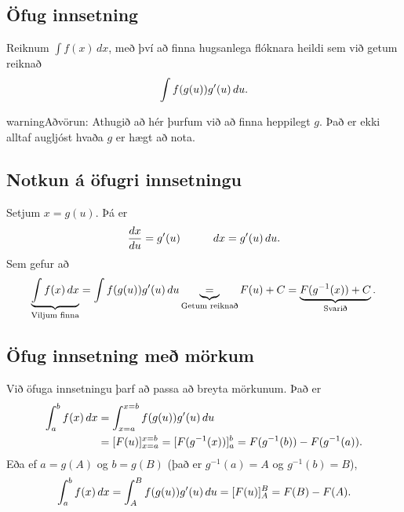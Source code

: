 \documentclass[b5paper,10pt,icelandic]{sphinxmanual}
\begin{document}
\subsection{Öfug innsetning}
\label{kafli06:ofug-innsetning}\label{kafli06:index-10}
Reiknum \(\int f(x)\, dx\), með því að finna hugsanlega flóknara
heildi sem við getum reiknað
\begin{gather}
\begin{split}\int f(g(u))g'(u)\, du.\end{split}\notag
\end{gather}
\begin{notice}{warning}{Aðvörun:}
Athugið að hér þurfum við að finna heppilegt \(g\). Það
er ekki alltaf augljóst hvaða \(g\) er hægt að nota.
\end{notice}


\subsection{Notkun á öfugri innsetningu}
\label{kafli06:notkun-a-ofugri-innsetningu}
Setjum \(x=g(u)\). Þá er
\begin{gather}
\begin{split}\frac{dx}{du}=g'(u)\qquad\quad dx=g'(u)\,du.\end{split}\notag
\end{gather}
Sem gefur að
\begin{gather}
\begin{split}\underbrace{\int f(x)\,dx}_{\text{Viljum finna}}  =
\int f(g(u))g'(u)\,du \underbrace{=}_{\text{Getum reiknað}} F(u) + C
= \underbrace{F(g^{-1}(x)) + C}_{\text{Svarið}}.\end{split}\notag
\end{gather}

\subsection{Öfug innsetning með mörkum}
\label{kafli06:ofug-innsetning-me-morkum}
Við öfuga innsetningu þarf að passa að breyta mörkunum. Það er
\begin{gather}
\begin{split}\begin{aligned}
\int_a^b f(x)\,dx    &= \int_{x=a}^{x=b} f(g(u))g'(u)\,du  \\
&= [F(u)]_{x=a}^{x=b} = [F(g^{-1}(x))]_a^b = F(g^{-1}(b)) - F(g^{-1}(a)).\end{aligned}\end{split}\notag
\end{gather}
Eða ef \(a=g(A)\) og \(b=g(B)\) (það er \(g^{-1}(a) = A\) og
\(g^{-1}(b) = B\)),
\begin{gather}
\begin{split}\int_a^b f(x)\,dx  = \int_A^B f(g(u))g'(u)\,du= [F(u)]_A^B = F(B) - F(A).\end{split}\notag
\end{gather}
\end{document}
